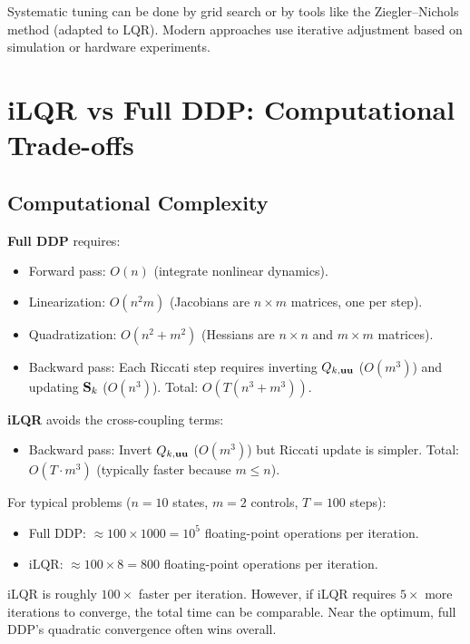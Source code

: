 Systematic tuning can be done by grid search or by tools like the Ziegler--Nichols method (adapted to LQR).
Modern approaches use iterative adjustment based on simulation or hardware experiments.

\section{iLQR vs Full DDP: Computational Trade-offs}
\label{sec:ch5:ilqr-vs-ddp}

\subsection{Computational Complexity}

\textbf{Full DDP} requires:
\begin{itemize}
\item Forward pass: $O(n)$ (integrate nonlinear dynamics).
\item Linearization: $O(n^2 m)$ (Jacobians are $n \times m$ matrices, one per step).
\item Quadratization: $O(n^2 + m^2)$ (Hessians are $n \times n$ and $m \times m$ matrices).
\item Backward pass: Each Riccati step requires inverting $Q_{k,\mathbf{u}\mathbf{u}}$ ($O(m^3)$) and updating $\mathbf{S}_k$ ($O(n^3)$).
  Total: $O(T(n^3 + m^3))$.
\end{itemize}

\textbf{iLQR} avoids the cross-coupling terms:
\begin{itemize}
\item Backward pass: Invert $Q_{k,\mathbf{u}\mathbf{u}}$ ($O(m^3)$) but Riccati update is simpler. Total: $O(T \cdot m^3)$ (typically faster
  because $m \leq n$).
\end{itemize}

For typical problems ($n = 10$ states, $m = 2$ controls, $T = 100$ steps):
\begin{itemize}
\item Full DDP: $\approx 100 \times 1000 = 10^5$ floating-point operations per iteration.
\item iLQR: $\approx 100 \times 8 = 800$ floating-point operations per iteration.
\end{itemize}

iLQR is roughly $100 \times$ faster per iteration. However, if iLQR requires $5 \times$ more iterations to converge,
the total time can be comparable. Near the optimum, full DDP's quadratic convergence often wins overall.


